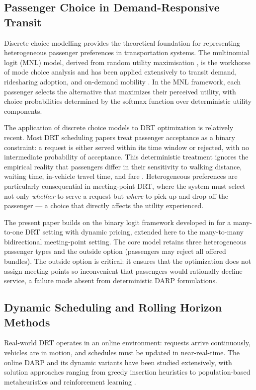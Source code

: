 \subsection{Passenger Choice in Demand-Responsive Transit}

Discrete choice modelling provides the theoretical foundation for representing heterogeneous passenger preferences in transportation systems. The multinomial logit (MNL) model, derived from random utility maximisation \citep{benakiva1985}, is the workhorse of mode choice analysis and has been applied extensively to transit demand, ridesharing adoption, and on-demand mobility \citep{lavieri2019}. In the MNL framework, each passenger selects the alternative that maximizes their perceived utility, with choice probabilities determined by the softmax function over deterministic utility components.

The application of discrete choice models to DRT optimization is relatively recent. Most DRT scheduling papers treat passenger acceptance as a binary constraint: a request is either served within its time window or rejected, with no intermediate probability of acceptance. This deterministic treatment ignores the empirical reality that passengers differ in their sensitivity to walking distance, waiting time, in-vehicle travel time, and fare \citep{lavieri2019}. Heterogeneous preferences are particularly consequential in meeting-point DRT, where the system must select not only \emph{whether} to serve a request but \emph{where} to pick up and drop off the passenger — a choice that directly affects the utility experienced.

The present paper builds on the binary logit framework developed in \citet{jin2024work1} for a many-to-one DRT setting with dynamic pricing, extended here to the many-to-many bidirectional meeting-point setting. The core model retains three heterogeneous passenger types and the outside option (passengers may reject all offered bundles). The outside option is critical: it ensures that the optimization does not assign meeting points so inconvenient that passengers would rationally decline service, a failure mode absent from deterministic DARP formulations.

\subsection{Dynamic Scheduling and Rolling Horizon Methods}

Real-world DRT operates in an online environment: requests arrive continuously, vehicles are in motion, and schedules must be updated in near-real-time. The online DARP \citep{psaraftis1988} and its dynamic variants have been studied extensively, with solution approaches ranging from greedy insertion heuristics to population-based metaheuristics and reinforcement learning \citep{pillac2013, ho2018}.

